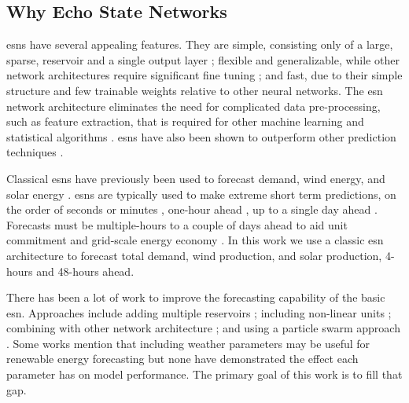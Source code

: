 \subsection{Why Echo State Networks}
\glspl{esn} have several appealing features. They are simple, consisting only
of a large, sparse, reservoir and a single output layer
\cite{lukosevicius_practical_2012}; flexible and generalizable,
while other network architectures require significant fine tuning
\cite{liu_deterministic_2019}; and fast, due to their simple structure and
few trainable weights relative to other neural networks. The \gls{esn} network
architecture eliminates the need for complicated data pre-processing, such as
feature extraction, that is required for other machine learning  and statistical
algorithms \cite{lazos_optimisation_2014, chen_day-ahead_2017}.
\glspl{esn} have also been shown to outperform other prediction techniques
\cite{jayawardene_comparison_2014,jayawardene_comparison_2015,shi_energy_2016,chitsazan_wind_2019, hu_forecasting_2020}.

Classical \glspl{esn} have previously been used to forecast demand, wind energy, and solar energy \cite{deihimi_application_2012,jayawardene_comparison_2015,hu_forecasting_2020}.
\glspl{esn} are typically used to make extreme short term predictions, on the
order of seconds or minutes
\cite{chen_novel_2019,wang_echo_2019,chitsazan_wind_2019}, one-hour ahead
\cite{shi_energy_2016}, up to a single day ahead
\cite{deihimi_application_2012}. Forecasts must be multiple-hours to a
couple of days ahead to aid unit commitment and grid-scale energy economy
\cite{wang_quantifying_2016,mc_garrigle_quantifying_2015,brancucci_martinez-anido_value_2016}. In this work we use a classic \gls{esn} architecture to
forecast total demand, wind production, and solar production, 4-hours and 48-hours ahead.

There has been a lot of work to improve the forecasting capability of
the basic \gls{esn}. Approaches include adding multiple reservoirs
\cite{hu_forecasting_2020,gallicchio_deep_2019,yao_novel_2019,li_multi-reservoir_2020}; including non-linear units \cite{holzmann_echo_2008, chitsazan_wind_2019}; combining with other network architecture
\cite{chen_novel_2019, lopez_wind_2018}; and using a particle swarm approach \cite{chouikhi_pso-based_2017,wang_echo_2019}. Some works mention that
including weather parameters may be useful for renewable energy forecasting
\cite{li_echo_2019,chitsazan_wind_2019} but none have demonstrated the effect
each parameter has on model performance. The primary goal of this work
is to fill that gap.


